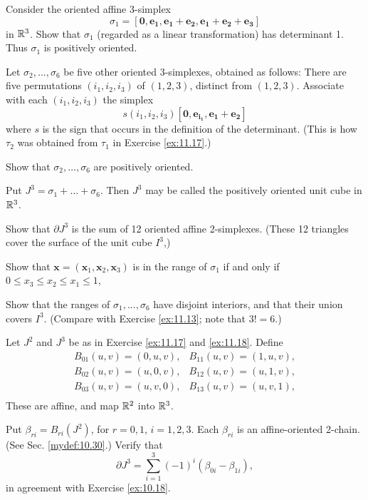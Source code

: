 \begin{myexercise}    
    \label{ex:10.18}
    Consider the oriented affine 3-simplex 
    \begin{equation*}
        \sigma_1 =  \left[ \mathbf{0,e_1,e_1+e_2,e_1+e_2+e_3} \right]
    \end{equation*}
    in ${\protect\mathbb R}^3$.
    Show that $\sigma_1$
    (regarded as a linear transformation) has determinant 1.
    Thus $\sigma_1$ is positively oriented.

    Let $\sigma_2 , ... , \sigma_6$ be five other oriented 3-simplexes, obtained as follows: 
    There are five permutations $(i_1, i_2, i_3)$ of $(1, 2, 3)$, distinct from $(1, 2, 3)$. 
    Associate with each $(i_1, i_2, i_3)$ the simplex 
    \begin{equation*}
        s(i_1, i_2, i_3) \left[ \mathbf{0,e_{i_1},e_1+e_2} \right]
    \end{equation*}
    where $s$ is the sign that occurs in the definition of the determinant. 
    (This is how $\tau_2$ was obtained from $\tau_1$ in Exercise \ref{ex:11.17}.)
    
    Show that $\sigma_2, \dots , \sigma_6$ are positively oriented.
    
    Put $J^3 = \sigma_1 + \dots + \sigma_6$. 
    Then $J^3$ may be called the positively oriented unit cube in ${\protect\mathbb R}^3$. 

    Show that $\partial J^3$ is the sum of 12 oriented affine 2-simplexes. 
    (These 12 triangles cover the surface of the unit cube $I^3$,)

    Show that $\mathbf{x} = (\mathbf{x}_1, \mathbf{x}_2, \mathbf{x}_3)$ is in the range of $\sigma_1$ if and only if $0 \leq x_3 \leq x_2 \leq x_1 \leq 1$,

    Show that the ranges of $\sigma_1, ... , \sigma_6$ have disjoint interiors, and that their union covers $I^3$. 
    (Compare with Exercise \ref{ex:11.13}; note that $3! = 6$.)
\end{myexercise}


\begin{myexercise}    
    \label{ex:10.19}
    Let $J^2$ and $J^3$ be as in Exercise \ref{ex:11.17} and \ref{ex:11.18}.
    Define
    \begin{align*}
        B_{01}(u,v) = (0,u,v), & B_{11}(u,v) = (1,u,v), \\
        B_{02}(u,v) = (u,0,v), & B_{12}(u,v) = (u,1,v), \\
        B_{03}(u,v) = (u,v,0), & B_{13}(u,v) = (u,v,1), \\
    \end{align*}
    These are affine, and map ${\protect\mathbb R}^2$ into ${\protect\mathbb R}^3$.

    Put $\beta_{ri} = B_{ri}(J^2)$, for $r = 0,1$, $i=1,2,3$.
    Each $\beta_{ri}$ is an affine-oriented 2-chain.
    (See Sec. \ref{mydef:10.30}.)
    Verify that 
    \begin{equation*}
        \partial J^3 = \sum_{i=1}^{3}(-1)^i (\beta_{0i}-\beta_{1i}),
    \end{equation*}
    in agreement with Exercise \ref{ex:10.18}.
\end{myexercise}



